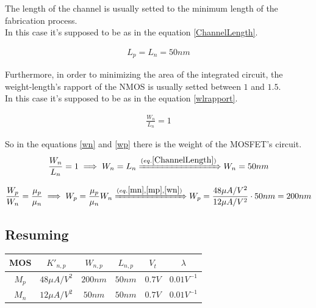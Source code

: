 The length of the channel is usually setted to the minimum length of the fabrication process.\\
In this case it's supposed to be as in the equation \ref{ChannelLength}.\par
\begin{align}
L_p = L_n = 50 nm \label{ChannelLength}
\end{align}

Furthermore, in order to minimizing the area of the integrated circuit, the weight-length's rapport of the NMOS is usually setted between $1$ and $1.5$.\\
In this case it's supposed to be as in the equation \ref{wlrapport}. \par
\begin{align}
\frac{W_n}{L_n} = 1 \label{wlrapport}
\end{align}

So in the equations \ref{wn} and \ref{wp} there is the weight of the MOSFET's circuit.\\

\begin{align}
\frac{W_n}{L_n} = 1 \implies W_n = L_n \xRightarrow{(eq. \ref{ChannelLength})} W_n = 50nm \label{wn}
\end{align} 

\begin{align}
\frac{W_p}{W_n} = \frac{\mu _p}{\mu _n} \implies W_p = \frac{\mu _p}{\mu _n}W_n \xRightarrow{(eq. \ref{mn}, \ref{mp}, \ref{wn})} W_p = \frac{48 \mu A / V^2}{12 \mu A / V^2} \cdot 50nm = 200nm
\end{align}

\subsection{Resuming}\label{MOSProperties}
\begin{center}
\begin{tabular}{|c|c|c|c|c|c|}
\hline
MOS & $K'_{n,p}$ & $W_{n,p}$ & $L_{n,p}$ & $V_t$ & $\lambda$\\
\hline
$M_p$ & $48 \mu A / V^2$ & $200nm$ & $50nm$ & $0.7V$ & $0.01 V^{-1}$\\
$M_n$ & $12 \mu A / V^2$ & $50nm$ & $50nm$ & $0.7V$ & $0.01 V^{-1}$\\
\hline
\end{tabular}
\end{center}

